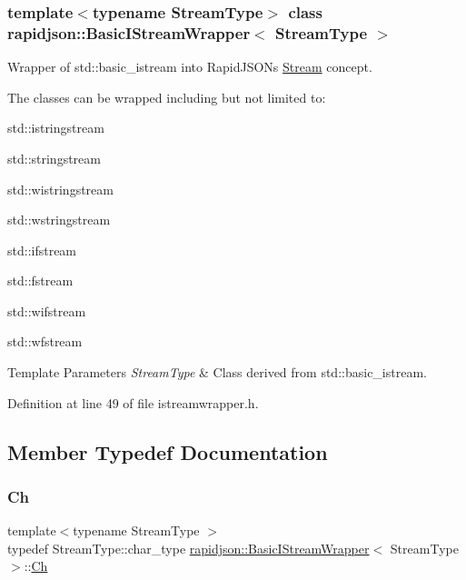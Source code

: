 \subsubsection*{template$<$typename Stream\+Type$>$\newline
class rapidjson\+::\+Basic\+I\+Stream\+Wrapper$<$ Stream\+Type $>$}

Wrapper of {\ttfamily std\+::basic\+\_\+istream} into Rapid\+J\+S\+ON\textquotesingle{}s \mbox{\hyperlink{classrapidjson_1_1_stream}{Stream}} concept. 

The classes can be wrapped including but not limited to\+:


\begin{DoxyItemize}
\item {\ttfamily std\+::istringstream} 
\item {\ttfamily std\+::stringstream} 
\item {\ttfamily std\+::wistringstream} 
\item {\ttfamily std\+::wstringstream} 
\item {\ttfamily std\+::ifstream} 
\item {\ttfamily std\+::fstream} 
\item {\ttfamily std\+::wifstream} 
\item {\ttfamily std\+::wfstream} 
\end{DoxyItemize}


\begin{DoxyTemplParams}{Template Parameters}
{\em Stream\+Type} & Class derived from {\ttfamily std\+::basic\+\_\+istream}. \\
\hline
\end{DoxyTemplParams}


Definition at line 49 of file istreamwrapper.\+h.



\subsection{Member Typedef Documentation}
\mbox{\label{classrapidjson_1_1_basic_i_stream_wrapper_a5fd972d8cd20b90ba0772aeebf122597}} 
\subsubsection{\texorpdfstring{Ch}{Ch}}
{\footnotesize\ttfamily template$<$typename Stream\+Type $>$ \\
typedef Stream\+Type\+::char\+\_\+type \mbox{\hyperlink{classrapidjson_1_1_basic_i_stream_wrapper}{rapidjson\+::\+Basic\+I\+Stream\+Wrapper}}$<$ Stream\+Type $>$\+::\mbox{\hyperlink{classrapidjson_1_1_basic_i_stream_wrapper_a5fd972d8cd20b90ba0772aeebf122597}{Ch}}}



